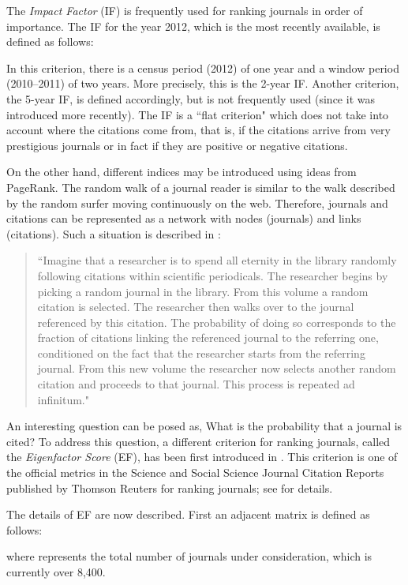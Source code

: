 \documentclass[11pt,draftcls,onecolumn]{IEEEtran}
\begin{document}
The {\it Impact Factor} (IF) is frequently used
for ranking journals in order of importance.
The IF for the year 2012, which is the most recently available, is defined as follows:

In this criterion, there is a census period (2012) of one year and a window 
period (2010--2011) of two years.  
More precisely, this is the 2-year IF. Another criterion, the 5-year IF, 
is defined accordingly, but is not frequently used (since it was introduced more
recently).
The IF is a ``flat criterion" which does not take into account 
where the citations come from, that is, if the citations arrive 
from very prestigious journals or in fact if they are positive or negative citations.


On the other hand, different indices may be introduced using ideas from PageRank. 
The random walk of a journal reader is similar to the walk described by the 
random surfer moving continuously on the web. Therefore, 
journals and citations can be represented as a network with 
nodes (journals) and links (citations). 
Such a situation is described in \cite{WesBerBer:10}: 
\begin{quote}
``Imagine that a researcher is to spend all eternity in the library randomly 
following citations within scientific periodicals. The researcher begins by 
picking a random journal in the library. From this volume a random citation 
is selected. The researcher then walks over to the journal referenced by this 
citation. The probability of doing so corresponds to the fraction of
citations linking the referenced journal to the referring one, 
conditioned on the fact that the researcher starts from the referring
journal. From this new volume the researcher now selects another 
random citation and proceeds to that journal. 
This process is repeated ad infinitum." 
\end{quote}
An interesting question can be posed as,
What is the probability that a journal is cited? To address this question, a different criterion for ranking journals, 
called the {\it Eigenfactor Score} (EF), has been first introduced in \cite{Ber:07}. This criterion is one of the official metrics 
in the Science and Social Science Journal Citation Reports
published
by Thomson Reuters for ranking journals; see \cite{Franceschet:13} for details.

The details of EF are now described. First an adjacent matrix 
 is defined as follows: 

where  represents the total number of journals under consideration, which is currently 
over 8,400.
\end{document}
